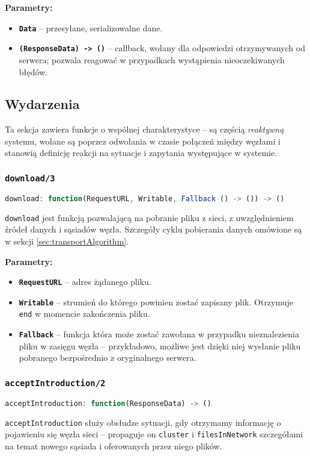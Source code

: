 \textbf{Parametry:}
\begin{itemize}
    \item \textbf{\texttt{Data}} -- przesyłane, serializowalne dane.
    \item \textbf{\texttt{(ResponseData) -> ()}} -- callback, wołany dla odpowiedzi otrzymywanych od serwera; pozwala reagować w przypadkach wystąpienia nieoczekiwanych błędów.
\end{itemize}

% 

\subsection{Wydarzenia}
Ta sekcja zawiera funkcje o wspólnej charakterystyce -- są częścią {\em reaktywną} systemu, wołane są poprzez odwołania w czasie połączeń między węzłami i stanowią definicję reakcji na sytuacje i zapytania występujące w systemie.

% 

\subsubsection{\texttt{download/3}}
\begin{lstlisting}[language=javascript]
     download: function(RequestURL, Writable, Fallback () -> ()) -> ()
\end{lstlisting}
\texttt{download} jest funkcją pozwalającą na pobranie pliku z sieci, z uwzględnieniem źródeł danych i sąsiadów węzła. Szczegóły cyklu pobierania danych omówione są w sekcji \ref{sec:transportAlgorithm}.

\textbf{Parametry:}
\begin{itemize}
    \item \textbf{\texttt{RequestURL}} -- adres żądanego pliku.
    \item \textbf{\texttt{Writable}} -- strumień do którego powinien zostać zapisany plik. Otrzymuje \texttt{end} w momencie zakończenia pliku.
    \item \textbf{\texttt{Fallback}} -- funkcja która może zostać zawołana w przypadku nieznalezienia pliku w zasięgu węzła -- przykładowo, możliwe jest dzięki niej wysłanie pliku pobranego bezpośrednio z oryginalnego serwera.
\end{itemize}

% 

\subsubsection{\texttt{acceptIntroduction/2}}
\begin{lstlisting}[language=javascript]
    acceptIntroduction: function(ResponseData) -> ()
\end{lstlisting}
\texttt{acceptIntroduction} służy obsłudze sytuacji, gdy otrzymamy informację o pojawieniu się węzła sieci -- propaguje on \texttt{cluster} i \texttt{filesInNetwork} szczegółami na temat nowego sąsiada i oferowanych przez niego plików. 

